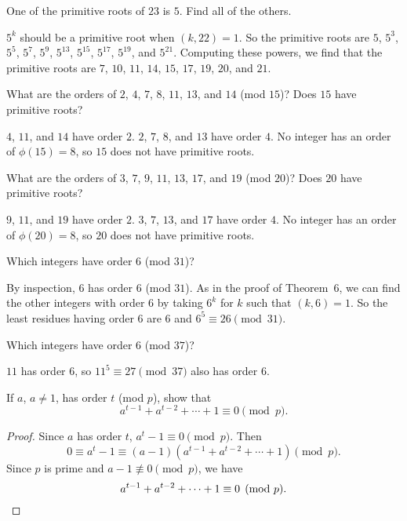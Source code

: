 One of the primitive roots of $23$ is $5$. Find all of the
others.
\begin{solution}
  $5^k$ should be a primitive root when $(k,22) = 1$. So the primitive
  roots are $5$, $5^3$, $5^5$, $5^7$, $5^9$, $5^{13}$, $5^{15}$,
  $5^{17}$, $5^{19}$, and $5^{21}$. Computing these powers, we find
  that the primitive roots are $7$, $10$, $11$, $14$, $15$, $17$,
  $19$, $20$, and $21$.
\end{solution}

 What are the orders of $2$, $4$, $7$, $8$, $11$, $13$, and
$14$ (mod $15$)? Does $15$ have primitive roots?
\begin{solution}
  $4$, $11$, and $14$ have order $2$. $2$, $7$, $8$, and $13$ have
  order $4$. No integer has an order of $\phi(15) = 8$, so $15$ does
  not have primitive roots.
\end{solution}

 What are the orders of $3$, $7$, $9$, $11$, $13$, $17$, and
$19$ (mod $20$)? Does $20$ have primitive roots?
\begin{solution}
  $9$, $11$, and $19$ have order $2$. $3$, $7$, $13$, and $17$ have
  order $4$. No integer has an order of $\phi(20) = 8$, so $20$ does
  not have primitive roots.
\end{solution}

 Which integers have order $6$ (mod $31$)?
\begin{solution}
  By inspection, $6$ has order $6$ (mod $31$). As in the proof of
  Theorem~6, we can find the other integers with order $6$ by taking
  $6^k$ for $k$ such that $(k,6) = 1$. So the least residues having
  order $6$ are $6$ and $6^5\equiv26\pmod{31}$.
\end{solution}

 Which integers have order $6$ (mod $37$)?
\begin{solution}
  $11$ has order $6$, so $11^5\equiv27\pmod{37}$ also has order $6$.
\end{solution}

 If $a$, $a\neq1$, has order $t$ (mod $p$), show that
\begin{equation*}
  a^{t-1} + a^{t-2} + \cdots + 1 \equiv 0\pmod{p}.
\end{equation*}
\begin{proof}
  Since $a$ has order $t$, $a^t-1\equiv0\pmod{p}$. Then
  \begin{equation*}
    0\equiv a^t - 1 \equiv
    (a - 1)(a^{t-1} + a^{t-2} + \cdots + 1)\pmod{p}.
  \end{equation*}
  Since $p$ is prime and $a - 1\not\equiv0\pmod{p}$, we have
  \begin{equation*}
    a^{t-1} + a^{t-2} + \cdots + 1 \equiv 0\pmod{p}. \qedhere
  \end{equation*}
\end{proof}

